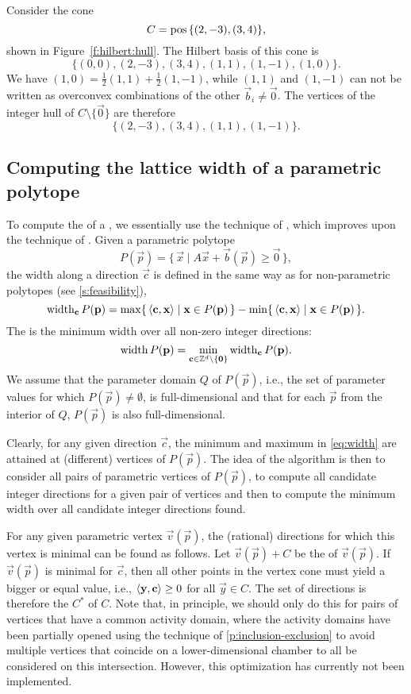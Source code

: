 \begin{example}
Consider the cone
$$
C = \mathop{\rm pos}\nolimits \,\{(2,-3), (3,4)\}
,
$$
shown in Figure~\ref{f:hilbert:hull}.
The Hilbert basis of this cone is
$$\{(0,0),(2,-3),(3,4),(1,1),(1,-1),(1,0)\}.$$
We have $(1,0) = \frac 1 2 (1,1) + \frac 1 2 (1,-1)$,
while $(1,1)$ and $(1,-1)$ can not be written as
overconvex combinations of the other $\vec b_i \ne \vec 0$.
The vertices of the integer hull of $C \setminus \{ \vec 0 \}$
are therefore
$$\{(2,-3),(3,4),(1,1),(1,-1)\}.$$
\end{example}


\subsection{Computing the lattice width of a parametric polytope}
\label{s:width}

To compute the  of a ,
we essentially use the technique of ,
which improves upon the technique of .
Given a parametric polytope
$$
P(\vec p) = \{\, \vec x \mid A \vec x + \vec b(\vec p) \ge \vec 0 \,\}
,
$$
the width along a direction $\vec c$ is defined in the same
way as for non-parametric polytopes (see \autoref{s:feasibility}),
\begin{equation}
\label{eq:width}
\width_{\vec c} P(\vec p)
=
\max \{\, \sp c x \mid \vec x \in P(\vec p) \,\}
-
\min \{\, \sp c x \mid \vec x \in P(\vec p) \,\}
.
\end{equation}
The  is the minimum width over all
non-zero integer directions:
$$
\width P(\vec p) =
\min_{\vec c \in \ZZ^d \setminus \{ \vec 0 \} } \width_{\vec c} P(\vec p)
.
$$
We assume that the parameter domain $Q$ of $P(\vec p)$, i.e., the
set of parameter values for which $P(\vec p) \ne \emptyset$,
is full-dimensional and that for each $\vec p$ from the interior
of $Q$, $P(\vec p)$ is also full-dimensional.

Clearly, for any given direction $\vec c$, the minimum and
maximum in \eqref{eq:width} are attained at (different)
vertices of $P(\vec p)$.
The idea of the algorithm is then to consider all pairs
of parametric vertices of $P(\vec p)$, to compute all candidate
integer directions for a given pair of vertices and then to
compute the minimum width over all candidate integer directions
found.

For any given parametric vertex $\vec v(\vec p)$, the (rational)
directions for which this vertex is minimal can be found as follows.
Let $\vec v(\vec p) + C$ be the  of $\vec v(\vec p)$.
If $\vec v(\vec p)$ is minimal for $\vec c$, then all other points
in the vertex cone must yield a bigger or equal value, i.e.,
$\sp y c \ge 0$ for all $\vec y \in C$.
The set of directions is therefore the  $C^*$ of $C$.
Note that, in principle, we should only do this for pairs
of vertices that have a common activity domain, where the
activity domains have been partially opened using the
technique of \autoref{p:inclusion-exclusion} to avoid
multiple vertices that coincide on a lower-dimensional
chamber to all be considered on this intersection.
However, this optimization has currently not been implemented.

